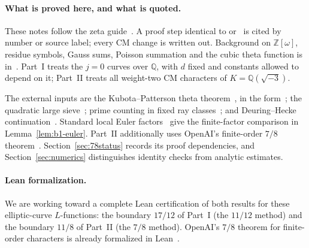 \documentclass[11pt]{article}
\numberwithin{equation}{section}
\newcommand{\OO}{\mathbb Z[\omega]}
\begin{document}
\paragraph{What is proved here, and what is quoted.}
These notes follow the zeta guide~\cite{ZG}. A proof step identical to
\cite{OAI1112} or~\cite{OAI78} is cited by number or source label; every CM change
is written out. Background on $\OO$, residue symbols, Gauss sums, Poisson summation
and the cubic theta function is in~\cite{QF}. Part~I treats the $j=0$ curves over
$\mathbb Q$, with $d$ fixed and constants allowed to depend on it; Part~II treats
all weight-two CM characters of $K=\mathbb Q(\sqrt{-3})$.

The external inputs are the Kubota--Patterson theta theorem~\cite{Kub69,Pat77},
in the form~\cite[Theorem~23]{QF}; the quadratic large sieve~\cite{HB95,GL}; prime
counting in fixed ray classes~\cite{Lan03,Hec17,Hec20}; and Deuring--Hecke
continuation~\cite{Deuring,Hec20}. Standard local Euler factors~\cite{SilAEC}
give the finite-factor comparison in Lemma~\ref{lem:b1-euler}.
Part~II additionally uses OpenAI's finite-order $7/8$ theorem~\cite{OAI78}.
Section~\ref{sec:78status} records its proof dependencies, and
Section~\ref{sec:numerics} distinguishes identity checks from analytic estimates.

\paragraph{Lean formalization.} We are working toward a complete Lean certification of both results for these
elliptic-curve $L$-functions: the boundary $17/12$ of Part~I (the $11/12$ method) and the boundary $11/8$ of
Part~II (the $7/8$ method). OpenAI's $7/8$ theorem for finite-order characters is already formalized
in Lean~\cite{OAIlean}.
\end{document}

